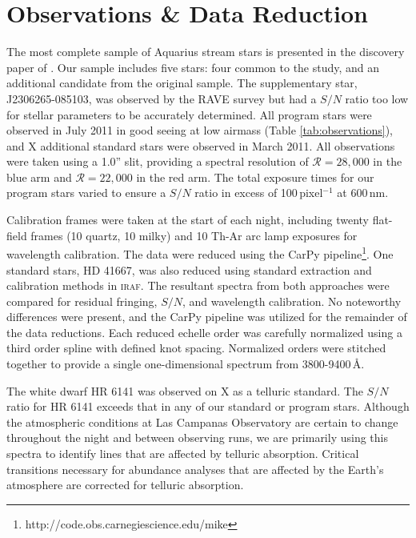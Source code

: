 \documentclass{emulateapj}
\begin{document}
\section{Observations \& Data Reduction}

The most complete sample of Aquarius stream stars is presented in the discovery paper of \citet{williams;et-al_2011}. Our sample includes five stars: four common to the \citet{wylie-de-boer;et-al_2012} study, and an additional candidate from the original \citet{williams;et-al_2011} sample. The supplementary star, J2306265-085103, was observed by the RAVE survey but had a $S/N$ ratio too low for stellar parameters to be accurately determined. All program stars were observed in July 2011 in good seeing at low airmass (Table \ref{tab:observations}), and X additional standard stars were observed in March 2011. All observations were taken using a 1.0'' slit, providing a spectral resolution of $\mathcal{R} = 28,000$ in the blue arm and $\mathcal{R} = 22,000$ in the red arm. The total exposure times for our program stars varied to ensure a $S/N$ ratio in excess of 100\,pixel$^{-1}$ at 600\,nm.


Calibration frames were taken at the start of each night, including twenty flat-field frames (10 quartz, 10 milky) and 10 Th-Ar arc lamp exposures for wavelength calibration. The data were reduced using the CarPy pipeline\footnote{http://code.obs.carnegiescience.edu/mike}. One standard stars, HD 41667, was also reduced using standard extraction and calibration methods in \textsc{iraf}. The resultant spectra from both approaches were compared for residual fringing, $S/N$, and wavelength calibration. No noteworthy differences were present, and the CarPy pipeline was utilized for the remainder of the data reductions. Each reduced echelle order was carefully normalized using a third order spline with defined knot spacing. Normalized orders were stitched together to provide a single one-dimensional spectrum from 3800-9400\,\AA{}. 
 
The white dwarf HR 6141 was observed on X as a telluric standard. The $S/N$ ratio for HR 6141 exceeds that in any of our standard or program stars. Although the atmospheric conditions at Las Campanas Observatory are certain to change throughout the night and between observing runs, we are primarily using this spectra to identify lines that are affected by telluric absorption. Critical transitions necessary for abundance analyses that are affected by the Earth's atmosphere are corrected for telluric absorption. 
\end{document}
